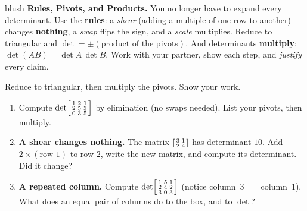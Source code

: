 \documentclass[10pt]{article}
\begin{document}
\namepartnerperiod

\vspace{0.10in}

\begin{headlinebox}{blush}
\small\textbf{Rules, Pivots, and Products.} You no longer have to expand every determinant. Use the
\textbf{rules}: a \emph{shear} (adding a multiple of one row to another) changes \textbf{nothing}, a
\emph{swap} flips the sign, and a \emph{scale} multiplies. Reduce to triangular and $\det=\pm(\text{product
of the pivots})$. And determinants \textbf{multiply}: $\det(AB)=\det A\,\det B$. Work with your partner,
show each step, and \emph{justify} every claim.
\end{headlinebox}

\vspace{0.10in}

\begin{tcolorbox}[colback=white, colframe=black!40, title=\textbf{Tier R --- Remediate},
    fonttitle=\bfseries, arc=1.5mm, left=3mm, right=3mm, top=2mm, bottom=2mm, breakable]
Reduce to triangular, then multiply the pivots. Show your work.
\begin{enumerate}[leftmargin=1.7em, itemsep=9pt]
  \item Compute $\det\begin{bsmallmatrix} 1 & 2 & 1 \\ 2 & 5 & 3 \\ 0 & 3 & 5 \end{bsmallmatrix}$ by
        elimination (no swaps needed). List your pivots, then multiply. 
  \item \textbf{A shear changes nothing.} The matrix $\begin{bsmallmatrix} 3 & 1 \\ 2 & 4 \end{bsmallmatrix}$
        has determinant $10$. Add $2\times(\text{row }1)$ to row $2$, write the new matrix, and compute
        its determinant. Did it change? \; \blank{3.2cm}
  \item \textbf{A repeated column.} Compute $\det\begin{bsmallmatrix} 1 & 5 & 1 \\ 2 & 4 & 2 \\ 3 & 0 & 3 \end{bsmallmatrix}$
        (notice column~3 $=$ column~1). What does an equal pair of columns do to the box, and to $\det$? \; \blank{3.0cm}
\end{enumerate}
\end{tcolorbox}
\end{document}
